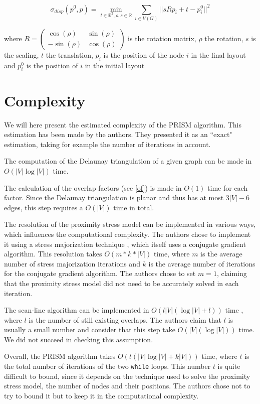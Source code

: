 \documentclass[12pt]{report}
\begin{document}
\[\sigma_{disp}(p^0, p) = \min_{t \in \mathbb{R}^2, \rho, s \in \mathbb{R}} 
\sum_{i \in V(G)} || s R p_i + t - p_i^0||^2 \]

where $R = \begin{pmatrix} \cos(\rho) & \sin(\rho) \\ -\sin(\rho) & \cos(\rho) \end{pmatrix}$ is the rotation matrix, $\rho$ the rotation, $s$ is the scaling, $t$ the translation, $p_i$ is the position of the node $i$ in the final layout and $p_i^0$ is the position of $i$ in the initial layout

\section{Complexity}

We will here present the estimated complexity of the PRISM algorithm. This estimation has been made by the authors. They presented it as an ``exact" estimation, taking for example the number of iterations in account.

The computation of the Delaunay triangulation of a given graph can be made in $O(|V| \log |V|)$ time.

The calculation of the overlap factors (see \ref{of}) is made in $O(1)$ time for each factor. Since the Delaunay triangulation is planar and thus has at most $3|V| -6$ edges, this step requires a $O(|V|)$ time in total.

The resolution of the proximity stress model can be implemented in various ways, which influences the computational complexity. The authors chose to implement it using a stress majorization technique \cite{Gansner05}, which itself uses a conjugate gradient algorithm. This resolution takes $O(m*k*|V|)$ time, where $m$ is the average number of stress majorization iterations and $k$ is the average number of iterations for the conjugate gradient algorithm. The authors chose to set $m =1$, claiming that the proximity stress model did not need to be accurately solved in each iteration.

The scan-line algorithm can be implemented in $O(l |V| (\log |V| + l))$ time \cite{VPSC06}, where $l$ is the number of still existing overlaps. The authors claim that $l$ is usually a small number and consider that this step take $O(|V| (\log |V|))$ time. We did not succeed in checking this assumption.

Overall, the PRISM algorithm takes $O(t(|V| \log |V| + k|V|))$ time, where $t$ is the total number of iterations of the two \texttt{while} loops. This number $t$ is quite difficult to bound, since it depends on the technique used to solve the proximity stress model, the number of nodes and their positions. The authors chose not to try to bound it but to keep it in the computational complexity.
\end{document}
